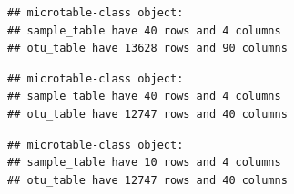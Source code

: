 \documentclass[
]{book}
\newenvironment{Shaded}{\begin{snugshade}}{\end{snugshade}}
\newcommand{\AttributeTok}[1]{\textcolor[rgb]{0.77,0.63,0.00}{#1}}
\newcommand{\ConstantTok}[1]{\textcolor[rgb]{0.00,0.00,0.00}{#1}}
\newcommand{\DecValTok}[1]{\textcolor[rgb]{0.00,0.00,0.81}{#1}}
\newcommand{\FunctionTok}[1]{\textcolor[rgb]{0.00,0.00,0.00}{#1}}
\newcommand{\NormalTok}[1]{#1}
\newcommand{\OtherTok}[1]{\textcolor[rgb]{0.56,0.35,0.01}{#1}}
\newcommand{\SpecialCharTok}[1]{\textcolor[rgb]{0.00,0.00,0.00}{#1}}
\begin{document}
\begin{Shaded}
\end{Shaded}

\begin{verbatim}
## microtable-class object:
## sample_table have 40 rows and 4 columns
## otu_table have 13628 rows and 90 columns
\end{verbatim}

\begin{Shaded}
\end{Shaded}

\begin{verbatim}
## microtable-class object:
## sample_table have 40 rows and 4 columns
## otu_table have 12747 rows and 40 columns
\end{verbatim}

\begin{Shaded}
\end{Shaded}

\begin{verbatim}
## microtable-class object:
## sample_table have 10 rows and 4 columns
## otu_table have 12747 rows and 40 columns
\end{verbatim}

\begin{Shaded}
\end{Shaded}
\end{document}
